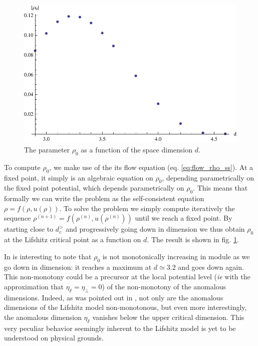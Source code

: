 \begin{figure}[htp]
\begin{center}
\includegraphics[scale=1]{img/chap4/rhod.pdf}
\caption{The parameter $\rho_0$ as a function of the space dimension $d$.}
\label{fig:rhod}
\end{center}
\end{figure}

To compute $\rho_0$, we make use of the its flow equation (eq. \ref{eq:flow_rho_ss}). At a fixed point, it simply is an algebraic equation on $\rho_0$, depending parametrically on the fixed point potential, which depends parametrically on $\rho_0$.  This means that formally we can write the problem as the self-consistent equation $\rho = f(\rho, u(\rho))$. To solve the problem we simply compute iteratively the sequence $\rho^{(n+1)} = f(\rho^{(n)}, u(\rho^{(n)}))$ until we reach a fixed point. By starting close to $d_c^>$ and progressively going down in dimension we thus obtain $\rho_0$ at the Lifshitz critical point as a function on $d$. The result is shown in fig. \ref{fig:rhod}. 

In is interesting to note that $\rho_0$ is not monotonically increasing in module as we go down in dimension: it reaches a maximum at $d \simeq 3.2$ and goes down again. This non-monotony could be a precursor at the local potential level (\textit{ie} with the approximation that $\eta_\sslash = \eta_\perp  = 0$) of the non-monotony of the anomalous dimensions. Indeed, as was pointed out in \cite{MouhannaLif}, not only are the anomalous dimensions of the Lifshitz model non-monotonous, but even more interestingly, the anomalous dimension $\eta_\sslash$ vanishes below the upper critical dimension. This very peculiar behavior seemingly inherent to the Lifshitz model  is yet to be understood on physical grounds.


